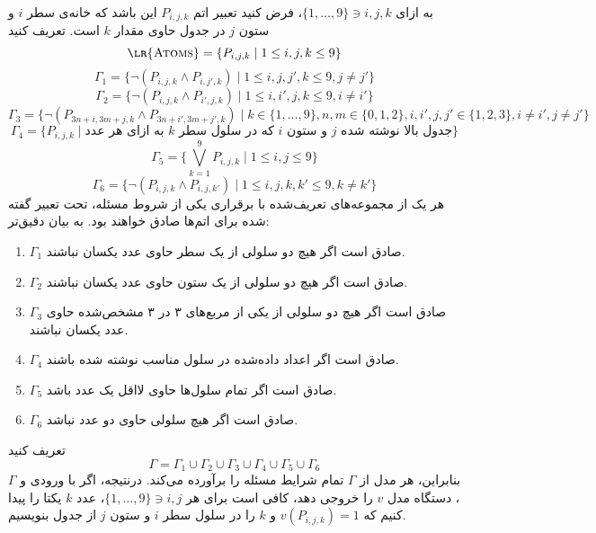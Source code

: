 \begin{ans}
  به ازای $\{ 1, \dots, 9 \} \ni i,j,k$، فرض کنید تعبیر اتم $P_{i,j,k}$ این باشد که خانه‌ی سطر $i$ و ستون $j$ در جدول حاوی مقدار $k$ است. تعریف کنید
  \[ {\textsc{\lr{Atoms}}} = \{ P_{i,j,k} \mid 1 \le i,j,k \le 9 \} \]
  \[ \Gamma_1 = \{ \neg (P_{i,j,k} \wedge P_{i,j',k}) \mid 1 \le i,j,j',k \le 9, j \neq j' \} \]
  \[ \Gamma_2 = \{ \neg (P_{i,j,k} \wedge P_{i',j,k}) \mid 1 \le i,i',j,k \le 9, i \neq i' \} \]
  \[ \Gamma_3 = \{ \neg (P_{3 n + i, 3 m + j, k} \wedge P_{3 n + i', 3 m + j', k}) \mid k \in \{1,\dots,9\}, n,m \in \{0,1,2\}, i,i',j,j' \in \{1,2,3\}, i \neq i', j \neq j' \} \]
  \[ \Gamma_4 = \{ P_{i,j,k} \mid \text{به ازای هر عدد $k$ که در سلول سطر $i$ و ستون $j$ جدول بالا نوشته شده} \} \]
  \[ \Gamma_5 = \{ \bigvee_{k=1}^9 P_{i,j,k} \mid 1 \le i, j \le 9\} \]
  \[ \Gamma_6 = \{ \neg (P_{i,j,k} \wedge P_{i,j,k'}) \mid 1 \le i,j,k,k' \le 9, k \neq k' \} \]
  هر یک از مجموعه‌های تعریف‌شده با برقراری یکی از شروط مسئله، تحت تعبیر گفته شده برای اتم‌ها صادق خواهند بود. به بیان دقیق‌تر:
  \begin{enumerate}[label=\alph*-]
    \item $\Gamma_1$ صادق است اگر هیچ دو سلولی از یک سطر حاوی عدد یکسان نباشند.
    \item $\Gamma_2$ صادق است اگر هیچ دو سلولی از یک ستون حاوی عدد یکسان نباشند.
    \item $\Gamma_3$ صادق است اگر هیچ دو سلولی از یکی از مربع‌های ۳ در ۳ مشخص‌شده حاوی عدد یکسان نباشند.
    \item $\Gamma_4$ صادق است اگر اعداد داده‌شده در سلول مناسب نوشته شده باشند.
    \item $\Gamma_5$ صادق است اگر تمام سلول‌ها حاوی لااقل یک عدد باشد.
    \item $\Gamma_6$ صادق است اگر هیچ سلولی حاوی دو عدد نباشد.
  \end{enumerate}
  تعریف کنید
  \[ \Gamma = \Gamma_1 \cup \Gamma_2 \cup \Gamma_3 \cup \Gamma_4 \cup \Gamma_5 \cup \Gamma_6 \]
  بنابراین، هر مدل از $\Gamma$ تمام شرایط مسئله را برآورده می‌کند. درنتیجه، اگر با ورودی \textsc{} و $\Gamma$، دستگاه مدل $v$ را خروجی دهد، کافی است برای هر $\{1, \dots, 9\} \ni i,j$، عدد $k$ یکتا را پیدا کنیم که $v(P_{i,j,k}) = 1$ و $k$ را در سلول سطر $i$ و ستون $j$ از جدول بنویسیم.
\end{ans}